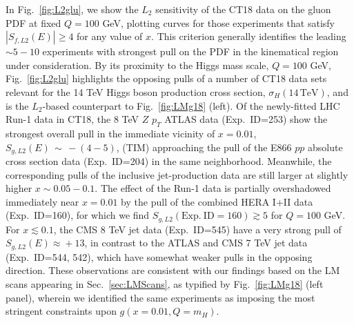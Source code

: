 In Fig.~\ref{fig:L2glu}, we show the $L_2$ sensitivity of the CT18 data
on the gluon PDF at fixed $Q\! =\! 100$ GeV, plotting curves for those
experiments that satisfy $|S_{f, L2}(E)| \ge 4$ for any value of $x$.
This criterion generally identifies the leading $\sim\! 5-10$ experiments with
strongest pull on the PDF in the kinematical region under consideration.
By its proximity to the Higgs mass scale, $Q\!=\!100$ GeV,
Fig.~\ref{fig:L2glu} highlights the opposing pulls of a number of CT18
data sets relevant for the 14 TeV Higgs boson production cross section,
$\sigma_H (14\,\mathrm{TeV})$, and is the $L_2$-based counterpart
to Fig.~\ref{fig:LMg18} (left). Of the newly-fitted LHC Run-1 data 
in CT18, the 8 TeV $Z$ $p_T$ ATLAS data
(Exp.~ID=253) show the strongest overall pull in the immediate vicinity of $x=0.01$, $S_{g, L2}(E)\, \sim\, -(4\!-\!5)$, {\color{red} (TIM) approaching the pull of the E866 $pp$
absolute cross section data (Exp.~ID=204) in the same neighborhood.
Meanwhile, the} corresponding pulls of the inclusive jet-production data are still larger
at slightly higher $x\! \sim\! 0.05-0.1$.  The effect of the Run-1 data is partially overshadowed immediately near $x\! =\! 0.01$ by the pull of the combined
HERA I+II data (Exp.~ID=160), for which we find $S_{g, L2}(\mathrm{Exp.~ID=160}) \gtrsim 5$
for $Q\! =\! 100$ GeV.  For $x\!\lesssim\! 0.1$, the CMS 8 TeV jet data (Exp.~ID=545)
have a very strong pull of $S_{g, L2}(E)\! \approx\! +13$, in contrast to the ATLAS and CMS 7 TeV jet data
(Exp.~ID=544, 542), which have somewhat weaker pulls in the opposing direction. These observations are consistent
with our findings based on the LM scans appearing in Sec.~\ref{sec:LMScans}, as typified by
Fig.~\ref{fig:LMg18} (left panel), wherein we identified the same experiments as imposing
the most stringent constraints upon $g(x\!=\!0.01, Q\!=\!m_H)$.

